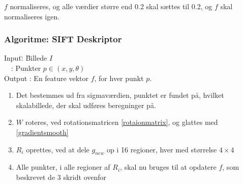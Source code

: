 $f$ normaliseres, og alle værdier større end 0.2 skal sættes til 0.2, og $f$ skal normaliseres igen.
\subsubsection*{Algoritme: SIFT Deskriptor}
\begin{tabbing}
Input\quad \= : \= Billede $I$\\
$\text{ }$ \> : \> Punkter $p \in (x, y, \theta)$ \\
Output \text{ } \> : \> En feature vektor $f$, for hver punkt $p$.
\end{tabbing}
\begin{enumerate}
\item Det bestemmes ud fra sigmaværdien, punktet er fundet på, hvilket skalabillede, der skal udføres beregninger på.
\item $W$ roteres, ved rotationsmatricen \eqref{rotaionmatrix}, og glattes med \eqref{gradientsmooth}
\item $R_{i}$ oprettes, ved at dele $g_{new}$ op i 16 regioner, hver med størrelse $4\times4$
\item Alle punkter, i alle regioner af $R_{i}$, skal nu bruges til at opdatere $f$, som beskrevet de 3 skridt ovenfor
\end{enumerate}